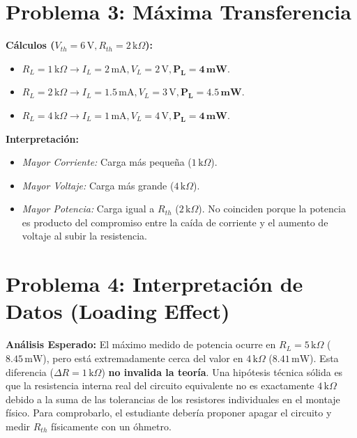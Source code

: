 \documentclass[11pt, a4paper]{article}
\begin{document}
\section*{Problema 3: Máxima Transferencia}
\textbf{Cálculos ($V_{th} = 6\,\text{V}, R_{th} = 2\,\text{k}\Omega$):}
\begin{itemize}
    \item $R_L = 1\,\text{k}\Omega \rightarrow I_L = 2\,\text{mA}, V_L = 2\,\text{V}, \mathbf{P_L = 4\,\text{mW}}$.
    \item $R_L = 2\,\text{k}\Omega \rightarrow I_L = 1.5\,\text{mA}, V_L = 3\,\text{V}, \mathbf{P_L = 4.5\,\text{mW}}$.
    \item $R_L = 4\,\text{k}\Omega \rightarrow I_L = 1\,\text{mA}, V_L = 4\,\text{V}, \mathbf{P_L = 4\,\text{mW}}$.
\end{itemize}
\textbf{Interpretación:}
\begin{itemize}
    \item \textit{Mayor Corriente:} Carga más pequeña ($1\,\text{k}\Omega$).
    \item \textit{Mayor Voltaje:} Carga más grande ($4\,\text{k}\Omega$).
    \item \textit{Mayor Potencia:} Carga igual a $R_{th}$ ($2\,\text{k}\Omega$). No coinciden porque la potencia es producto del compromiso entre la caída de corriente y el aumento de voltaje al subir la resistencia.
\end{itemize}

\section*{Problema 4: Interpretación de Datos (Loading Effect)}
\textbf{Análisis Esperado:}
El máximo medido de potencia ocurre en $R_L = 5\,\text{k}\Omega$ ($8.45\,\text{mW}$), pero está extremadamente cerca del valor en $4\,\text{k}\Omega$ ($8.41\,\text{mW}$). Esta diferencia ($\Delta R = 1\,\text{k}\Omega$) \textbf{no invalida la teoría}. Una hipótesis técnica sólida es que la resistencia interna real del circuito equivalente no es exactamente $4\,\text{k}\Omega$ debido a la suma de las tolerancias de los resistores individuales en el montaje físico. Para comprobarlo, el estudiante debería proponer apagar el circuito y medir $R_{th}$ físicamente con un óhmetro.
\end{document}
